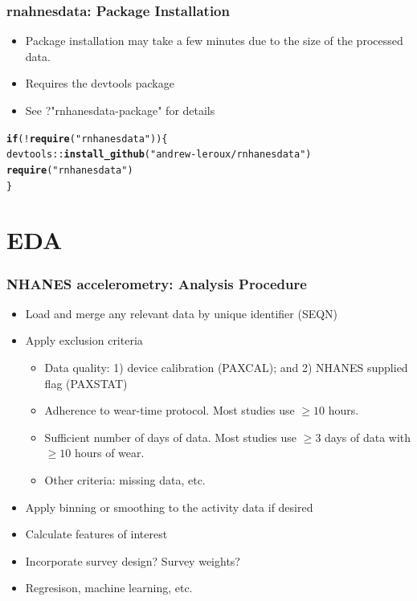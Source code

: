 \documentclass[10pt]{beamer}\usepackage[]{graphicx}\usepackage[]{color}
\makeatletter
\newcommand{\hlstr}[1]{\textcolor[rgb]{0.192,0.494,0.8}{#1}}%
\newcommand{\hlopt}[1]{\textcolor[rgb]{0,0,0}{#1}}%
\newcommand{\hlstd}[1]{\textcolor[rgb]{0.345,0.345,0.345}{#1}}%
\newcommand{\hlkwa}[1]{\textcolor[rgb]{0.161,0.373,0.58}{\textbf{#1}}}%
\newcommand{\hlkwd}[1]{\textcolor[rgb]{0.737,0.353,0.396}{\textbf{#1}}}%
\newenvironment{kframe}{%
 \def\at@end@of@kframe{}%
 \ifinner\ifhmode%
  \def\at@end@of@kframe{\end{minipage}}%
  \begin{minipage}{\columnwidth}%
 \fi\fi%
 \def\FrameCommand##1{\hskip\@totalleftmargin \hskip-\fboxsep
 \colorbox{shadecolor}{##1}\hskip-\fboxsep
     \hskip-\linewidth \hskip-\@totalleftmargin \hskip\columnwidth}%
 \MakeFramed {\advance\hsize-\width
   \@totalleftmargin\z@ \linewidth\hsize
   \@setminipage}}%
 {\par\unskip\endMakeFramed%
 \at@end@of@kframe}
\newenvironment{knitrout}{}{} %
\makeatother
\begin{document}
\begin{frame}[fragile]
\frametitle{rnahnesdata: Package Installation}

\begin{itemize}
\item Package installation may take a few minutes due to the size of the processed data.
\item Requires the devtools package 
\item See ?"rnhanesdata-package" for details
\end{itemize}

\begin{knitrout}\small
{}\color{fgcolor}\begin{kframe}
\begin{alltt}
\hlkwa{if}\hlstd{(}\hlopt{!}\hlkwd{require}\hlstd{(}\hlstr{"rnhanesdata"}\hlstd{))\{}
    \hlstd{devtools}\hlopt{::}\hlkwd{install_github}\hlstd{(}\hlstr{"andrew-leroux/rnhanesdata"}\hlstd{)}
    \hlkwd{require}\hlstd{(}\hlstr{"rnhanesdata"}\hlstd{)}
\hlstd{\}}
\end{alltt}
\end{kframe}
\end{knitrout}
\end{frame}



\section{EDA}




\begin{frame}
\frametitle{NHANES accelerometry: Analysis Procedure}
\begin{itemize}
\item Load and merge any relevant data by unique identifier (SEQN)
\item Apply exclusion criteria
    \begin{itemize}
    \item Data quality: 1) device calibration (PAXCAL); and 2) NHANES supplied flag (PAXSTAT)
    \item Adherence to wear-time protocol. Most studies use $\geq 10$ hours.
    \item Sufficient number of days of data. Most studies use $ \geq 3$ days of data with $\geq 10$ hours of wear.
    \item Other criteria: missing data, etc.
    \end{itemize}   
\item Apply binning or smoothing to the activity data if desired
\item Calculate features of interest
\item Incorporate survey design? Survey weights?
\item Regresison, machine learning, etc.
\end{itemize}
\end{frame}
\end{document}
